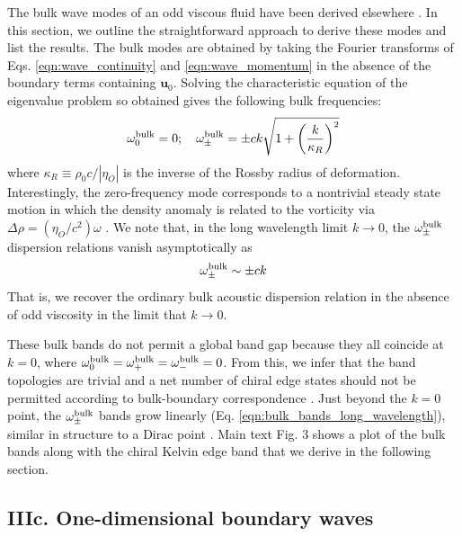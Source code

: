 \documentclass[%
 reprint,
superscriptaddress,
longbibliography,
 amsmath,amssymb,
 prl,
 citeautoscript,
]{revtex4-1}
\begin{document}
The bulk wave modes of an odd viscous fluid have been derived elsewhere \cite{boundary_waves}. In this section, we outline the straightforward approach to derive these modes and list the results. The bulk modes are obtained by taking the Fourier transforms of Eqs. \ref{eqn:wave_continuity} and \ref{eqn:wave_momentum} in the absence of the boundary terms containing ${\boldsymbol u}_0$. Solving the characteristic equation of the eigenvalue problem so obtained gives the following bulk frequencies:
\begin{equation}
\omega_0^{\rm bulk} = 0; \quad \omega_{\pm}^{\rm bulk} = \pm c k \sqrt{ 1 + \left( \frac{k}{\kappa_R} \right)^2 }
\label{eqn:bulk_bands}
\end{equation}
where $\kappa_R \equiv \rho_0 c / \left| \eta_O \right|$ is the inverse of the Rossby radius of deformation. Interestingly, the zero-frequency mode corresponds to a nontrivial steady state motion in which the density anomaly is related to the vorticity via $\Delta \rho = (\eta_O / c^2) \omega$ \cite{boundary_waves}. We note that, in the long wavelength limit $k \rightarrow 0$, the $\omega_{\pm}^{\rm bulk}$ dispersion relations vanish asymptotically as
\begin{equation}
\omega_{\pm}^{\rm bulk} \sim \pm c k
\label{eqn:bulk_bands_long_wavelength}
\end{equation}
That is, we recover the ordinary bulk acoustic dispersion relation in the absence of odd viscosity in the limit that $k \rightarrow 0$.

These bulk bands do not permit a global band gap because they all coincide at $k = 0$, where $\omega_0^{\rm bulk} = \omega_+^{\rm bulk} = \omega_-^{\rm bulk} = 0$. From this, we infer that the band topologies are trivial and a net number of chiral edge states should not be permitted according to bulk-boundary correspondence \cite{topology_soft_matter, boundary_waves, fuchs}. Just beyond the $k = 0$ point, the $\omega_{\pm}^{\rm bulk}$ bands grow linearly (Eq. \ref{eqn:bulk_bands_long_wavelength}), similar in structure to a Dirac point \cite{waves_Kranthi, continuum_topology, gauge_theory}. Main text Fig. 3 shows a plot of the bulk bands along with the chiral Kelvin edge band that we derive in the following section.

\subsection{IIIc. One-dimensional boundary waves}
\end{document}
